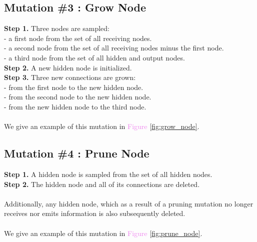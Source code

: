 \documentclass{article} %
\begin{document}
\begin{minipage}{\linewidth}
\centering
\begin{minipage}{0.484\linewidth}

\subsection{Mutation \#3 : Grow Node} \label{grow_node}
\textbf{Step 1.} Three nodes are sampled:\\
- a first node from the set of all receiving nodes.\\
- a second node from the set of all receiving nodes minus the first node.\\
- a third node from the set of all hidden and output nodes.\\
\textbf{Step 2.} A new hidden node is initialized\footnotemark.\\
\textbf{Step 3.} Three new connections are grown:\\
- from the first node to the new hidden node.\\
- from the second node to the new hidden node.\\
- from the new hidden node to the third node.\\\\
We give an example of this mutation in \textcolor{violet}{Figure \ref{fig:grow_node}}.


\end{minipage}
\hspace{0.02\linewidth}
\begin{minipage}{0.484\linewidth}

\subsection{Mutation \#4 : Prune Node} \label{prune_node}
\textbf{Step 1.} A hidden node is sampled from the set of all hidden nodes.\\
\textbf{Step 2.} The hidden node and all of its connections are deleted.\\\\
Additionally, any hidden node, which as a result of a pruning mutation no longer receives nor emits information is also subsequently deleted.\\\\
We give an example of this mutation in \textcolor{violet}{Figure \ref{fig:prune_node}}.
\vspace{2.1em}

\end{minipage}
\end{minipage}
\end{document}
